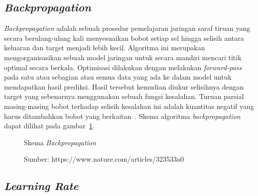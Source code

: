 \subsection{\textit{Backpropagation}}

\textit{Backpropagation} adalah sebuah prosedur pemelajaran jaringan saraf tiruan yang secara
berulang-ulang kali menyesuaikan bobot setiap sel hingga selisih antara keluaran dan target menjadi
lebih kecil. Algoritma ini merupakan mengorganisasikan sebuah model jaringan untuk secara mandiri
mencari titik optimal secara berkala. Optimisasi dilakukan dengan melakukan \textit{forward-pass}
pada satu atau sebagian atau semua data yang ada ke dalam model untuk mendapatkan hasil prediksi.
Hasil tersebut kemudian diukur selisihnya dengan target yang sebenarnya menggunakan sebuah fungsi
kesalahan. Turuan parsial masing-masing bobot terhadap selisih kesalahan ini adalah kuantitas negatif
yang harus ditambahkan bobot yang berkaitan~\cite{Rumelhart:1986we}. Skema algoritma \textit{backpropagation}
dapat dilihat pada gambar~\ref{fig:backprop}.

\begin{figure}[htbp]
    \begin{center}
    \end{center}
    \vspace{-20pt}
    \captionsetup{labelfont=bf, textfont=bf}
    \caption{Skema \textit{Backpropagation}}
    \vspace{-10pt}
    \captionsetup{labelfont=md, textfont=md}
    \caption*{Sumber: https://www.nature.com/articles/323533a0}
    \label{fig:backprop}
\end{figure}

\pagebreak

\subsection{\textit{Learning Rate}}

